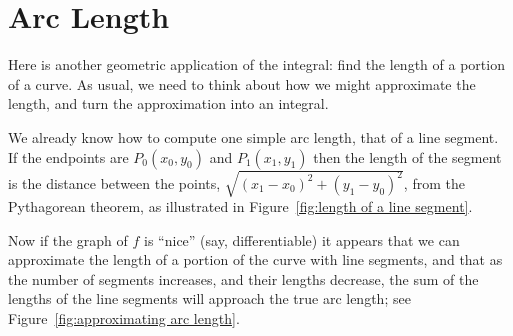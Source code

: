\section{Arc Length}

Here is another geometric application of the integral: find the length
of a portion of a curve. As usual, we need to think about how we might
approximate the length, and turn the approximation into an integral.

We already know how to compute one simple arc length, that of a line
segment. If the endpoints are $P_0(x_0,y_0)$ and $P_1(x_1,y_1)$
then the length of the segment is the distance between the points,
$\sqrt{(x_1-x_0)^2+(y_1-y_0)^2}$, from the Pythagorean theorem, as
illustrated in Figure~\ref{fig:length of a line segment}.


Now if the graph of $f$ is ``nice'' (say, differentiable) it appears
that we can approximate the length of a portion of the curve with line
segments, and that as the number of segments increases, and their
lengths decrease, the sum of the lengths of the line segments will
approach the true arc length; see 
Figure~\ref{fig:approximating arc length}.


